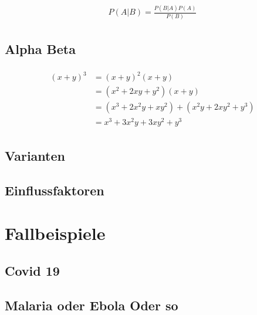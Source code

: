 \documentclass[12pt]{scrartcl} %
\begin{document}
\begin{align} 
	\label{eq:bayes}
	\begin{split}
		P(A|B) = \frac{P(B|A)P(A)}{P(B)}
	\end{split}					
\end{align}


\subsection{Alpha Beta}

\begin{align} 
	\begin{split}
		(x+y)^3 &= (x+y)^2(x+y)\\
		&=(x^2+2xy+y^2)(x+y)\\
		&=(x^3+2x^2y+xy^2) + (x^2y+2xy^2+y^3)\\
		&=x^3+3x^2y+3xy^2+y^3
	\end{split}					
\end{align}


\subsection{Varianten}


\subsection{Einflussfaktoren}


\section{Fallbeispiele}

\subsection{Covid 19}


\subsection{Malaria oder Ebola Oder so}
\end{document}
